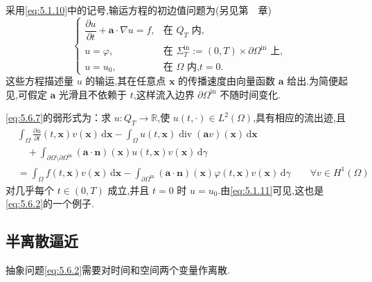 \begin{example}[(线性输运问题)]\label{ex:5.6.3}
采用\eqref{eq:5.1.10}中的记号,输运方程的初边值问题为(另见第~~章)
\begin{equation}\label{eq:5.6.7}
  \begin{cases}
    \dfrac{\partial u}{\partial t}+\boldsymbol{a}\cdot\nabla u=f,
      &\text{在 }Q_T\text{ 内},\\[2pt]
    u=\varphi,&\text{在 }\Sigma_T^{\mathrm{in}}:=(0,T)\times\partial\Omega^{\mathrm{in}}\text{ 上},\\
    u=u_0,&\text{在 }\Omega\text{ 内,}t=0.
  \end{cases}
\end{equation}
这些方程描述量 \(u\) 的输运,其在任意点 \(\boldsymbol{x}\) 的传播速度由向量函数 \(\boldsymbol{a}\) 给出.为简便起见,可假定 \(\boldsymbol{a}\) 光滑且不依赖于 \(t\),这样流入边界 \(\partial\Omega^{\mathrm{in}}\) 不随时间变化.

\eqref{eq:5.6.7}的弱形式为：求 \(u\colon Q_T\to\mathbb R\),使 \(u(t,\cdot)\in L^2(\Omega)\),具有相应的流出迹,且
\begin{equation}\label{eq:5.6.8}
  \begin{aligned}
    &\int_\Omega\frac{\partial u}{\partial t}(t,\boldsymbol{x})v(\boldsymbol{x})\,\mathrm d\boldsymbol{x}
    -\int_\Omega u(t,\boldsymbol{x})\operatorname{div}(\boldsymbol{a}v)(\boldsymbol{x})\,\mathrm d\boldsymbol{x}\\
    &\quad+\int_{\partial\Omega\setminus\partial\Omega^{\mathrm{in}}}
      (\boldsymbol{a}\cdot\boldsymbol{n})(\boldsymbol{x})u(t,\boldsymbol{x})v(\boldsymbol{x})\,\mathrm d\gamma\\
    &=\int_\Omega f(t,\boldsymbol{x})v(\boldsymbol{x})\,\mathrm d\boldsymbol{x}
      -\int_{\partial\Omega^{\mathrm{in}}}(\boldsymbol{a}\cdot\boldsymbol{n})(\boldsymbol{x})
           \varphi(t,\boldsymbol{x})v(\boldsymbol{x})\,\mathrm d\gamma
     \qquad\forall v\in H^1(\Omega)
  \end{aligned}
\end{equation}
对几乎每个 \(t\in(0,T)\) 成立,并且 \(t=0\) 时 \(u=u_0\).由\eqref{eq:5.1.11}可见,这也是\eqref{eq:5.6.2}的一个例子.
\end{example}

\subsection{半离散逼近}\label{sec:5.6.1}

抽象问题\eqref{eq:5.6.2}需要对时间和空间两个变量作离散.

